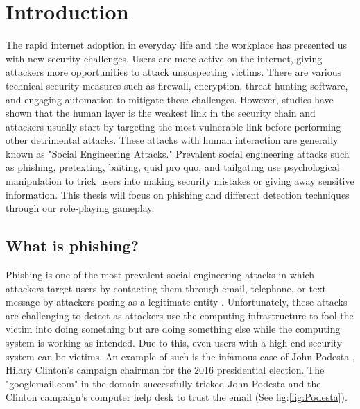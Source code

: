 

\pagestyle{plain} %
\setcounter{page}{1}


\chapter{Introduction}
The rapid internet adoption in everyday life and the workplace has presented us with new security challenges. Users are more active on the internet, giving attackers more opportunities to attack unsuspecting victims. There are various technical security measures such as firewall, encryption, threat hunting software, and engaging automation to mitigate these challenges. However, studies have shown that the human layer is the weakest link in the security chain \cite{jampen} and attackers usually start by targeting the most vulnerable link before performing other detrimental attacks. These attacks with human interaction are generally known as "Social Engineering Attacks." Prevalent social engineering attacks such as phishing, pretexting, baiting, quid pro quo, and tailgating use psychological manipulation to trick users into making security mistakes or giving away sensitive information. This thesis will focus on phishing and different detection techniques through our role-playing gameplay.

\section{What is phishing?}
Phishing is one of the most prevalent social engineering attacks in which attackers target users by contacting them through email, telephone, or text message by attackers posing as a legitimate entity \cite{phishing, apwg}. Unfortunately, these attacks are challenging to detect as attackers use the computing infrastructure to fool the victim into doing something but are doing something else while the computing system is working as intended. Due to this, even users with a high-end security system can be victims. An example of such is the infamous case of John Podesta \cite{Podesta}, Hilary Clinton's campaign chairman for the 2016 presidential election. The "googlemail.com" in the domain successfully tricked John Podesta and the Clinton campaign's computer help desk to trust the email (See fig:\ref{fig:Podesta}).


